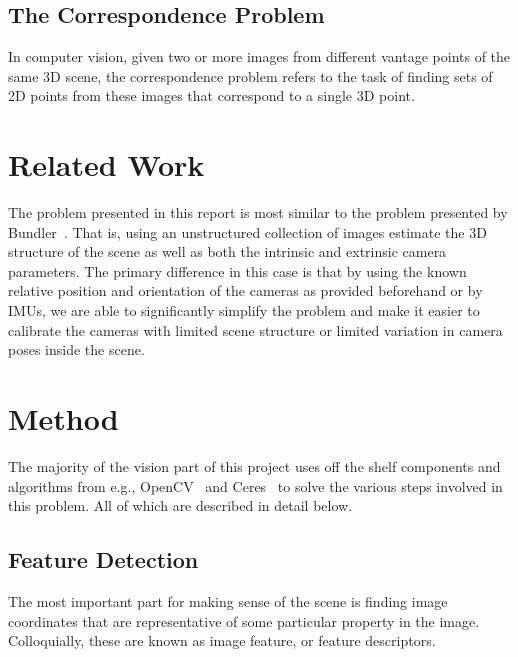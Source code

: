 \documentclass[preprint,acmtog]{acmart}
\begin{document}
\subsection{The Correspondence Problem}

In computer vision, given two or more images from different vantage points of
the same 3D scene, the correspondence problem refers to the task of finding sets
of 2D points from these images that correspond to a single 3D point.


\section{Related Work}


The problem presented in this report is most similar to the problem presented by
Bundler~\cite{bundler2006}. That is, using an unstructured collection of images
estimate the 3D structure of the scene as well as both the intrinsic and
extrinsic camera parameters. The primary difference in this case is that by
using the known relative position and orientation of the cameras as provided
beforehand or by IMUs, we are able to significantly simplify the problem and
make it easier to calibrate the cameras with limited scene structure or limited
variation in camera poses inside the scene.


\section{Method}

The majority of the vision part of this project uses off the shelf components
and algorithms from e.g., OpenCV~\cite{opencv_library} and
Ceres~\cite{ceres-solver} to solve the various steps involved in this
problem. All of which are described in detail below.

\subsection{Feature Detection}

The most important part for making sense of the scene is finding image
coordinates that are representative of some particular property in the
image. Colloquially, these are known as image feature, or feature descriptors.
\end{document}

